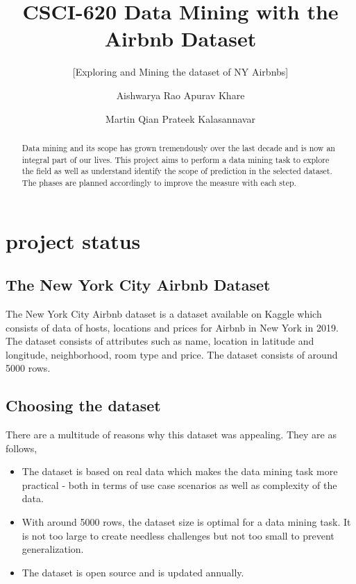 \documentclass{sig-alternate}
\begin{document}
	\title{CSCI-620 Data Mining with the Airbnb Dataset}
	\subtitle{[Exploring and Mining the dataset of NY Airbnbs]}
	
	\author
	{
		\alignauthor
		Aishwarya Rao
		\alignauthor
		Apurav Khare
		\and
		\alignauthor
		Martin Qian
		\alignauthor
		Prateek Kalasannavar
	}
	
	\maketitle
	\begin{abstract}
		
		Data mining and its scope has grown tremendously over the last decade and is now an integral part of our lives. This project aims to perform a data mining task to explore the field as well as understand identify the scope of prediction in the selected dataset. The phases are planned accordingly to improve the measure with each step. 
		
	\end{abstract}
	
	\section{project status}
	
	\subsection{The New York City Airbnb Dataset}
	The New York City Airbnb dataset is a dataset available on Kaggle which consists of data of hosts, locations and prices for Airbnb in New York in 2019. The dataset consists of attributes such as name, location in latitude and longitude, neighborhood, room type and price. The dataset consists of around 5000 rows. 
	
	\subsection{Choosing the dataset}
	There are a multitude of reasons why this dataset was appealing. They are as follows,
	\begin{itemize}
		\item The dataset is based on real data which makes the data mining task more practical - both in terms of use case scenarios as well as complexity of the data.
		\item With around 5000 rows, the dataset size is optimal for a data mining task. It is not too large to create needless challenges but not too small to prevent generalization.
		\item The dataset is open source and is updated annually. 
	\end{itemize}
	
\end{document}
